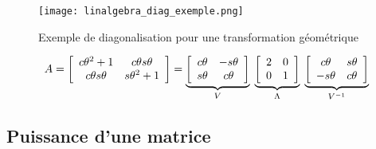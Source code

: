 \begin{example}
\label{sec:ExempleDeDiagonalisationPourUneDillatationEn2D}
\begin{figure}[H]
	\centering
		\texttt{[image: linalgebra\_diag\_exemple.png]}
	\caption{Exemple de diagonalisation pour une transformation géométrique}
	\label{fig:linalgebra_diag_exemple}
\end{figure}

\begin{align}
A =
\left[ \begin{array}{c c}  
c\theta^2+1     & c\theta s\theta \\
c\theta s\theta & s\theta^2+1
\end{array} \right]
=
\underbrace{
\left[ \begin{array}{c c}  
c\theta & - s\theta \\ 
s\theta &   c\theta 
\end{array} \right]
}_{V}
\;
\underbrace{
\left[ \begin{array}{c c}  
2 & 0 \\
0 & 1 
\end{array} \right]
}_{\Lambda}
\;
\underbrace{
\left[ \begin{array}{c c}  
c\theta &   s\theta \\ 
- s\theta &   c\theta 
\end{array} \right]
}_{V^{-1}}
\end{align}
\end{example}








\subsection{Puissance d'une matrice}

